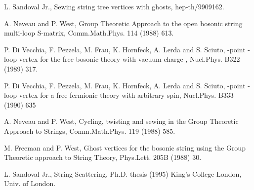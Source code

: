 \documentclass[a4paper,11pt]{article}
\begin{document}
\begin{thebibliography}{99}

L. Sandoval Jr., Sewing string tree vertices with ghosts, hep-th/9909162.

A. Neveau and P. West, Group Theoretic Approach to the open bosonic string multi-loop S-matrix, Comm.Math.Phys. 114 (1988) 613.

P. Di Vecchia, F. Pezzela, M. Frau, K. Hornfeck, A. Lerda and S. Sciuto, \coordHE{}-point \coordHE{}-loop vertex for the free bosonic theory with vacuum charge \coordHE{}, Nucl.Phys. B322 (1989) 317.

P. Di Vecchia, F. Pezzela, M. Frau, K. Hornfeck, A. Lerda and S. Sciuto, \coordHE{}-point \coordHE{}-loop vertex for a free fermionic theory with arbitrary spin, Nucl.Phys. B333 (1990) 635

A. Neveau and P. West, Cycling, twisting and sewing in the Group Theoretic Approach to Strings, Comm.Math.Phys. 119 (1988) 585.

M. Freeman and P. West, Ghost vertices for the bosonic string using the Group Theoretic approach to String Theory, Phys.Lett. 205B (1988) 30.

 L. Sandoval Jr., String Scattering, Ph.D. thesis (1995) King's College London, Univ. of London.

\end{thebibliography}
\end{document}
